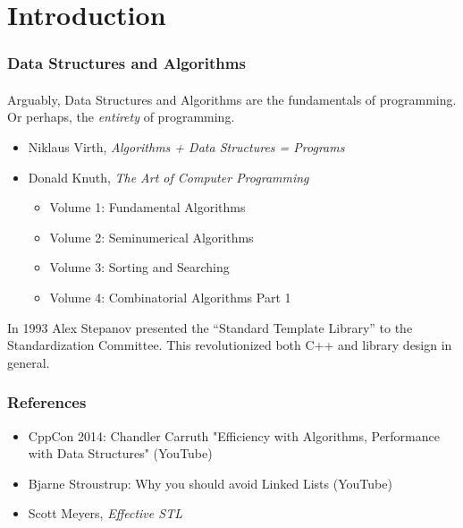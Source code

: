 \section{Introduction}

\begin{frame}[fragile]
\frametitle{Data Structures and Algorithms}
\framesubtitle{}
Arguably, Data Structures and Algorithms are the fundamentals of programming.
Or perhaps, the \emph{entirety} of programming.
\begin{itemize}
\item Niklaus Virth, \emph{Algorithms + Data Structures = Programs}
\item Donald Knuth, \emph{The Art of Computer Programming}
\begin{itemize}
  \item Volume 1: Fundamental Algorithms
  \item Volume 2: Seminumerical Algorithms
  \item Volume 3: Sorting and Searching
  \item Volume 4: Combinatorial Algorithms Part 1
\end{itemize}
\end{itemize}

In 1993 Alex Stepanov presented the ``Standard Template Library'' to
the \CC Standardization Committee.  This revolutionized both C++ and
library design in general.

\end{frame}


\begin{frame}[fragile]
\frametitle{References}
\begin{itemize}
\item CppCon 2014: Chandler Carruth "Efficiency with Algorithms,
  Performance with Data Structures" (YouTube)
\item Bjarne Stroustrup: Why you should avoid Linked Lists (YouTube)
\item Scott Meyers, \emph{Effective STL}
\end{itemize}
\end{frame}

